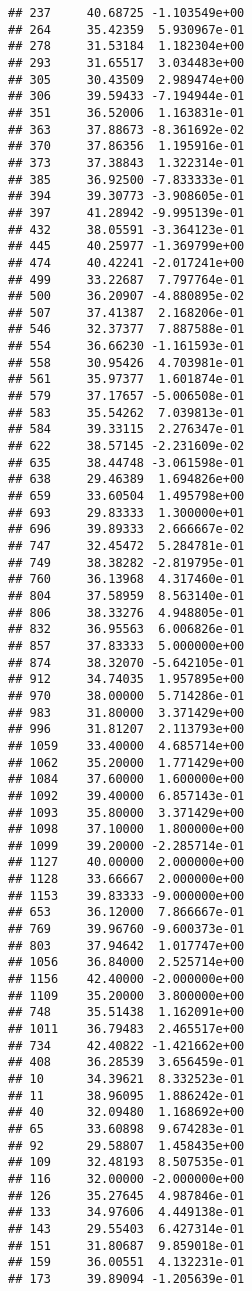\documentclass[
]{article}
\begin{document}
\begin{verbatim}
## 237     40.68725 -1.103549e+00
## 264     35.42359  5.930967e-01
## 278     31.53184  1.182304e+00
## 293     31.65517  3.034483e+00
## 305     30.43509  2.989474e+00
## 306     39.59433 -7.194944e-01
## 351     36.52006  1.163831e-01
## 363     37.88673 -8.361692e-02
## 370     37.86356  1.195916e-01
## 373     37.38843  1.322314e-01
## 385     36.92500 -7.833333e-01
## 394     39.30773 -3.908605e-01
## 397     41.28942 -9.995139e-01
## 432     38.05591 -3.364123e-01
## 445     40.25977 -1.369799e+00
## 474     40.42241 -2.017241e+00
## 499     33.22687  7.797764e-01
## 500     36.20907 -4.880895e-02
## 507     37.41387  2.168206e-01
## 546     32.37377  7.887588e-01
## 554     36.66230 -1.161593e-01
## 558     30.95426  4.703981e-01
## 561     35.97377  1.601874e-01
## 579     37.17657 -5.006508e-01
## 583     35.54262  7.039813e-01
## 584     39.33115  2.276347e-01
## 622     38.57145 -2.231609e-02
## 635     38.44748 -3.061598e-01
## 638     29.46389  1.694826e+00
## 659     33.60504  1.495798e+00
## 693     29.83333  1.300000e+01
## 696     39.89333  2.666667e-02
## 747     32.45472  5.284781e-01
## 749     38.38282 -2.819795e-01
## 760     36.13968  4.317460e-01
## 804     37.58959  8.563140e-01
## 806     38.33276  4.948805e-01
## 832     36.95563  6.006826e-01
## 857     37.83333  5.000000e+00
## 874     38.32070 -5.642105e-01
## 912     34.74035  1.957895e+00
## 970     38.00000  5.714286e-01
## 983     31.80000  3.371429e+00
## 996     31.81207  2.113793e+00
## 1059    33.40000  4.685714e+00
## 1062    35.20000  1.771429e+00
## 1084    37.60000  1.600000e+00
## 1092    39.40000  6.857143e-01
## 1093    35.80000  3.371429e+00
## 1098    37.10000  1.800000e+00
## 1099    39.20000 -2.285714e-01
## 1127    40.00000  2.000000e+00
## 1128    33.66667  2.000000e+00
## 1153    39.83333 -9.000000e+00
## 653     36.12000  7.866667e-01
## 769     39.96760 -9.600373e-01
## 803     37.94642  1.017747e+00
## 1056    36.84000  2.525714e+00
## 1156    42.40000 -2.000000e+00
## 1109    35.20000  3.800000e+00
## 748     35.51438  1.162091e+00
## 1011    36.79483  2.465517e+00
## 734     42.40822 -1.421662e+00
## 408     36.28539  3.656459e-01
## 10      34.39621  8.332523e-01
## 11      38.96095  1.886242e-01
## 40      32.09480  1.168692e+00
## 65      33.60898  9.674283e-01
## 92      29.58807  1.458435e+00
## 109     32.48193  8.507535e-01
## 116     32.00000 -2.000000e+00
## 126     35.27645  4.987846e-01
## 133     34.97606  4.449138e-01
## 143     29.55403  6.427314e-01
## 151     31.80687  9.859018e-01
## 159     36.00551  4.132231e-01
## 173     39.89094 -1.205639e-01

\end{verbatim}
\end{document}
